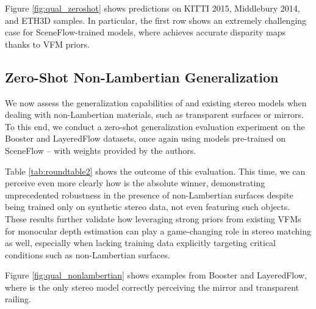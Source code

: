 Figure \ref{fig:qual_zeroshot} shows predictions on KITTI 2015, Middlebury 2014, and ETH3D samples. In particular, the first row shows an extremely challenging case for SceneFlow-trained models, where \method achieves accurate disparity maps thanks to VFM priors. 



\subsection{Zero-Shot Non-Lambertian Generalization}

We now assess the generalization capabilities of \method and existing stereo models when dealing with non-Lambertian materials, such as transparent surfaces or mirrors. To this end, we conduct a zero-shot generalization evaluation experiment on the Booster \cite{Ramirez_2022_CVPR} and LayeredFlow \cite{wen2024layeredflow} datasets, once again using models pre-trained on SceneFlow \cite{mayer2016large} -- with weights provided by the authors. 

Table \ref{tab:roundtable2} shows the outcome of this evaluation. This time, we can perceive even more clearly how \method is the absolute winner, demonstrating unprecedented robustness in the presence of non-Lambertian surfaces despite being trained only on synthetic stereo data, not even featuring such objects. These results further validate how leveraging strong priors from existing VFMs for monocular depth estimation can play a game-changing role in stereo matching as well, especially when lacking training data explicitly targeting critical conditions such as non-Lambertian surfaces.

Figure \ref{fig:qual_nonlambertian} shows examples from Booster and LayeredFlow, where \method is the only stereo model correctly perceiving the mirror and transparent railing.


